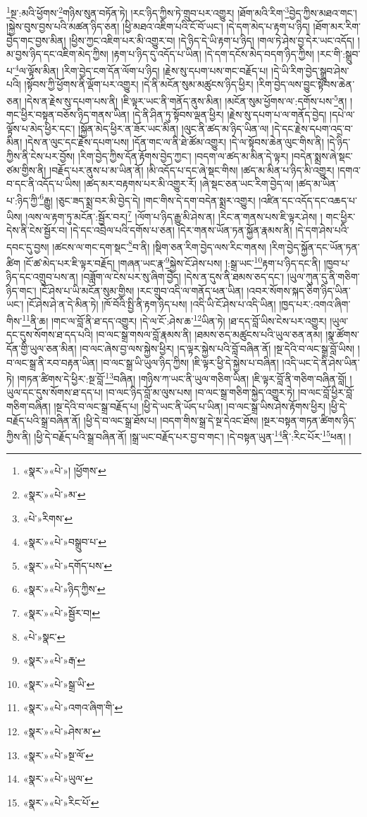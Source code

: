 \footnote{«སྣར་»«པེ་»། །ཕྱོགས་}སྔ་:མའི་ཕྱོགས་\footnote{«སྣར་»«པེ་»མ་}གཉིས་སུན་བཏོན་ཏེ། །རང་ཉིད་ཀྱིས་ཏེ་གྲུབ་པར་འགྱུར། །ཐོག་མའི་རིག་\footnote{«པེ་»རིགས་}བྱེད་ཀྱིས་མཐའ་གང་། །སྐྱེས་བུས་བྱས་པའི་མཚན་ཉིད་ཅན། །ཕྱི་མཐའ་འཇིག་པའི་ངོ་བོ་ཡང་། །དེ་དག་མེད་པ་རྟག་པ་ཉིད། །ཐོག་མར་རིག་བྱེད་གང་བྱས་མིན། །ཕྱིས་ཀྱང་འཇིག་པར་མི་འགྱུར་བ། །དེ་ཉིད་དེ་ཡི་རྟག་པ་ཉིད། །གལ་ཏེ་ཤེས་བྱ་དེར་ཡང་འདོད། །མ་བྱས་ཉིད་དང་འཇིག་མེད་ཀྱིས། །རྟག་པ་ཉིད་དུ་འདོད་པ་ཡིན། །དེ་དག་དངོས་མེད་བདག་ཉིད་ཀྱིས། །རང་གི་:སྒྲུབ་པ་\footnote{«སྣར་»«པེ་»བསྒྲུབ་པ་}ལ་ལྟོས་མིན། །རིག་བྱེད་ངག་དོན་ལོག་པ་ཉིད། །རྗེས་སུ་དཔག་པས་གང་བརྗོད་པ། །དེ་ཡི་རིག་བྱེད་སྒྲུབ་ཤེས་པའི། །སྟོབས་ཀྱི་ཕྱོགས་ནི་ལྡོག་པར་འགྱུར། །དེ་ནི་མངོན་སུམ་མཚུངས་ཉིད་ཕྱིར། །རིག་བྱེད་ལས་བྱུང་སྟོབས་ཆེན་ཅན། །དེས་ན་རྗེས་སུ་དཔག་པས་ནི། །ཇི་ལྟར་ཡང་ནི་གནོད་ནུས་མིན། །མངོན་སུམ་ཕྱོགས་ལ་:དགོས་པས་\footnote{«སྣར་»«པེ་»དགོད་པས་}ན། །གང་ཕྱིར་བསྟན་བཅོས་ཉིད་གནས་ཡིན། །དེ་ནི་ཤིན་ཏུ་སྟོབས་ལྡན་ཕྱིར། །རྗེས་སུ་དཔག་པ་ལ་གནོད་བྱེད། །དཔེ་ལ་ལྟོས་པ་མེད་ཕྱིར་དང་། །སྐྱོན་མེད་ཕྱིར་ན་ཟོར་ཡང་མིན། །ལུང་ནི་ཚད་མ་ཉིད་ཡིན་ལ། །དེ་དང་རྗེས་དཔག་འདྲ་བ་མིན། །དེས་ན་ལུང་དང་རྗེས་དཔག་པས། །དོན་གང་ལ་ནི་ཐེ་ཚོམ་འགྱུར། །དེ་ལ་སྟོབས་ཆེན་ལུང་གིས་ནི། །དེ་ཉིད་ཀྱིས་ནི་ངེས་པར་བྱོས། །རིག་བྱེད་ཀྱིས་དོན་རྟོགས་བྱེད་ཀྱང་། །བདག་ལ་ཚད་མ་མིན་དེ་ལྟར། །བདེན་སྨྲས་ཞེ་སྡང་ཙམ་གྱིས་ནི། །བརྗོད་པར་ནུས་པ་མ་ཡིན་ནོ། །མི་འདོད་པ་དང་ཞེ་སྡང་གིས། །ཚད་མ་མིན་པ་ཉིད་མི་འགྱུར། །དགའ་བ་དང་ནི་འདོད་པ་ཡིས། །ཚད་མར་བརྟགས་པར་མི་འགྱུར་རོ། །ཞེ་སྡང་ཅན་ཡང་རིག་བྱེད་ལ། །ཚད་མ་ཡིན་པ་:ཉིད་ཀྱི་\footnote{«སྣར་»«པེ་»ཉིད་ཀྱིས་}རྒྱུ། །ཅུང་ཟད་སྨྲ་བར་མི་བྱེད་དེ། །གང་གིས་དེ་དག་བདེན་སྨྲར་འགྱུར། །འཛིན་དང་འདོད་དང་འཆད་པ་ཡིས། །ལས་ལ་རྟག་ཏུ་མངོན་:སྦྱོར་བར།\footnote{«སྣར་»«པེ་»སྦྱོར་བ།} །ལོག་པ་ཉིད་རྒྱུ་མི་ཤེས་ན། །རིང་ན་གནས་པས་ཇི་ལྟར་ཤེས། །
གང་ཕྱིར་དེས་ནི་ངེས་སྦྱོར་བ། །དེ་དང་འབྲེལ་པའི་དགོས་པ་ཅན། །དེར་གནས་ཡོན་ཏན་སྐྱོན་རྣམས་ནི། །དེ་དག་ཤེས་པའི་དབང་དུ་བྱས། །ཚངས་ལ་གང་དག་སྡང་\footnote{«པེ་»སྣང་}བ་ནི། །སྡིག་ཅན་རིག་བྱེད་ལས་རིང་གནས། །རིག་བྱེད་སྐྱོན་དང་ཡོན་ཏན་ཚིག །ངོ་ཚ་མེད་པར་ཇི་ལྟར་བརྗོད། །གཞན་ཡང་རྣ་\footnote{«སྣར་»«པེ་»རྒ་}སྐྱེས་ངོ་ཤེས་པས། །:སྒྲ་ཡང་\footnote{«སྣར་»«པེ་»སྒྲ་ཡི་}རྟག་པ་ཉིད་དང་ནི། །ཁྱབ་པ་ཉིད་དང་འགྲུབ་པས་ན། །བཟློག་ལ་ངེས་པར་སུ་ཞིག་བྱེད། །དེས་ན་དུས་ནི་ཐམས་ཅད་དང་། །ཡུལ་ཀུན་དུ་ནི་གཅིག་ཉིད་གང་། །ངོ་ཤེས་པ་ཡི་མངོན་སུམ་གྱིས། །རང་གྲུབ་འདི་ལ་གནོད་ཕན་ཡིན། །འབར་སོགས་སྐད་ཅིག་ཉིད་ཡིན་ཡང་། །ངོ་ཤེས་ཤེ་ན་དེ་མིན་ཏེ། །ཁོ་བོའི་སྤྱི་ནི་རྟག་ཉིད་པས། །འདི་ཡི་ངོ་ཤེས་པ་འདི་ཡིན། །ཁྱད་པར་:འགའ་ཞིག་གིས་\footnote{«སྣར་»«པེ་»འགའ་ཞིག་གི་}ནི་ཆ། །གང་ལ་བློ་ནི་ཐ་དད་འགྱུར། །དེ་ལ་ངོ་:ཤེས་ཆ་\footnote{«སྣར་»«པེ་»ཤེས་མ་}ཡིན་ཏེ། །ཐ་དད་བློ་ཡིས་ངེས་པར་འགྱུར། །ཡུལ་དང་དུས་སོགས་ཐ་དད་པའི། །བ་ལང་སྒྲ་གསལ་བློ་རྣམས་ནི། །ཐམས་ཅད་མཚུངས་པའི་ཡུལ་ཅན་ནམ། །སྣ་ཚོགས་དོན་གྱི་ཡུལ་ཅན་མིན། །བ་ལང་ཞེས་བྱ་ལས་སྐྱེས་ཕྱིར། །ད་ལྟར་སྐྱེས་པའི་བློ་བཞིན་ནོ། །སྔ་དེའི་བ་ལང་སྒྲ་བློ་ཡིས། །བ་ལང་སྒྲ་ནི་རབ་བརྟན་ཡིན། །བ་ལང་སྒྲ་ཡི་ཡུལ་ཉིད་ཀྱིས། །ཇི་ལྟར་ཕྱི་དེ་སྐྱེས་པ་བཞིན། །འདི་ཡང་དེ་ནི་ཤེས་ཡིན་ཏེ། །གཏན་ཚིགས་དེ་ཕྱིར་:སྔ་བློ་\footnote{«སྣར་»«པེ་»སྔ་ལོ་}བཞིན། །གཉིས་ཀ་ཡང་ནི་ཡུལ་གཅིག་ཡིན། །ཇི་ལྟར་བློ་ནི་གཅིག་བཞིན་བློ། །ཡུལ་དང་དུས་སོགས་ཐ་དད་པ། །བ་ལང་ཉིད་བློ་མ་ལུས་པས། །བ་ལང་སྒྲ་གཅིག་སྐྱེད་འགྱུར་ཏེ། །བ་ལང་བློ་ཕྱིར་བློ་གཅིག་བཞིན། །སྔ་དེའི་བ་ལང་སྒྲ་བརྗོད་པ། །ཕྱི་དེ་ཡང་ནི་ཡོད་པ་ཡིན། །བ་ལང་སྒྲ་ཡིས་ཤེས་རྟོགས་ཕྱིར། །ཕྱི་དེ་བརྗོད་པའི་སྒྲ་བཞིན་ནོ། །ཕྱི་དེ་བ་ལང་སྒྲ་ཐོས་པ། །བདག་གིས་སྒྲ་དེ་སྔ་དེའང་ཐོས། །སྔར་བསྟན་གཏན་ཚིགས་ཉིད་ཀྱིས་ནི། །ཕྱི་དེ་བརྗོད་པའི་སྒྲ་བཞིན་ནོ། །སྒྲ་ཡང་བརྗོད་པར་བྱ་བ་གང་། །དེ་བསྟན་ཡུན་\footnote{«སྣར་»«པེ་»ཡུལ་}ནི་:རིང་པོར་\footnote{«སྣར་»«པེ་»རིང་པོ་}ཕན། །
